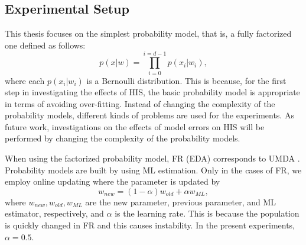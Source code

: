 \subsection{Experimental Setup}
\label{exp-rpm-setup}
This thesis focuses on the simplest probability model, 
that is, a fully factorized one defined as follows:
\begin{equation}
 p(x|w)=\prod_{i=0}^{i=d-1} p(x_i|w_i),
\end{equation}
where each $p(x_i|w_i)$ is a Bernoulli distribution.
This is because, for the first step in investigating the effects of HIS,
the basic probability model is appropriate 
in terms of avoiding over-fitting.
Instead of changing the complexity of the probability models,
different kinds of problems are used for the experiments.
As future work, investigations on the effects of model errors on HIS 
will be performed 
by changing the complexity of the probability models.

When using the factorized probability model, 
FR (EDA) corresponds to UMDA \cite{muhlenbein:umda}.
Probability models are built by using ML estimation.
Only in the cases of FR,
we employ online updating where
the parameter is updated by
\begin{equation}
 w_{new}=(1-\alpha) w_{old} + \alpha w_{ML},
\end{equation}
where $w_{new},w_{old},w_{ML}$ are the new parameter,
previous parameter, and ML estimator, respectively, and
$\alpha$ is the learning rate.
This is because the population is quickly changed in FR and 
this causes instability. In the present experiments, $\alpha=0.5$.


